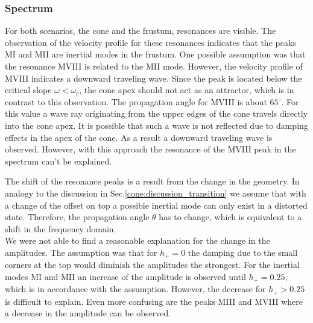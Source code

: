 \subsubsection{Spectrum}

For both scenarios, the cone and the frustum, resonances are visible.
The observation of the velocity profile for these resonances indicates
that the peaks M\RN{1} and M\RN{2} are inertial modes in the frustum.
One possible assumption was that the resonance M\RN{8} is related to the M\RN{2} mode.
However, the velocity profile of M\RN{8} indicates a downward traveling wave.
Since the peak is located below the critical slope $\omega < \omega_c$, the cone apex
should not act as an attractor, which is in contrast to this observation.
The propagation angle for M\RN{8} is about $65^\circ$.
For this value a wave ray originating from the upper edges of the cone travels directly
into the cone apex.
It is possible that such a wave is not reflected due to damping effects in
the apex of the cone. As a result a downward traveling wave is observed.
However, with this approach the resonance of the M\RN{8} peak
in the spectrum can't be explained.

The shift of the resonance peaks is a result from the change in the geometry.
In analogy to the discussion in Sec.\ref{cone:discussion_transition}
we assume that with a change of the offset on top
a possible inertial mode can only exist in a distorted state.
Therefore, the propagation angle $\theta$ has to change,
which is equivalent to a shift in the frequency domain.\\
We were not able to find a reasonable explanation for the change in the amplitudes.
The assumption was that for $h_+=0$ the damping due to the small corners at the top
would diminish the amplitudes the strongest.
For the inertial modes M\RN{1} and M\RN{2} an increase of the amplitude is observed until $h_+=0.25$,
which is in accordance with the assumption.
However, the decrease for $h_+>0.25$ is difficult to explain.
Even more confusing are  the peaks M\RN{3} and M\RN{8} where a decrease in the amplitude
can be observed.

